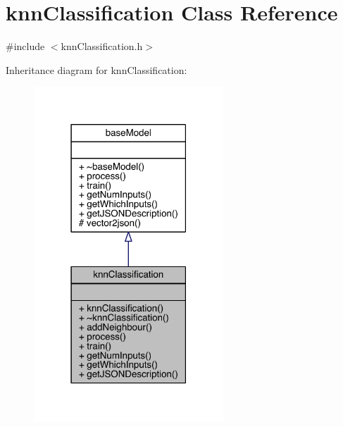 \hypertarget{classknn_classification}{}\section{knn\+Classification Class Reference}
\label{classknn_classification}


{\ttfamily \#include $<$knn\+Classification.\+h$>$}



Inheritance diagram for knn\+Classification\+:
\nopagebreak
\begin{figure}[H]
\begin{center}
\leavevmode
\includegraphics[width=202pt]{classknn_classification__inherit__graph}
\end{center}
\end{figure}


